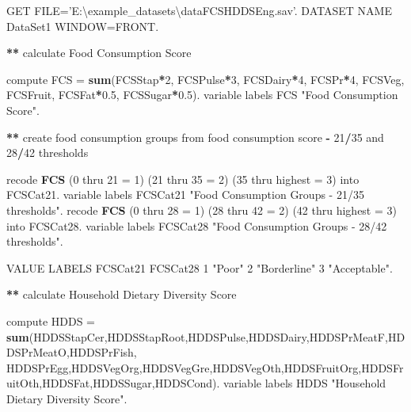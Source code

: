 \documentclass[
]{book}
\newenvironment{Shaded}{\begin{snugshade}}{\end{snugshade}}
\newcommand{\CharTok}[1]{\textcolor[rgb]{0.31,0.60,0.02}{#1}}
\newcommand{\DataTypeTok}[1]{\textcolor[rgb]{0.13,0.29,0.53}{#1}}
\newcommand{\DecValTok}[1]{\textcolor[rgb]{0.00,0.00,0.81}{#1}}
\newcommand{\FloatTok}[1]{\textcolor[rgb]{0.00,0.00,0.81}{#1}}
\newcommand{\KeywordTok}[1]{\textcolor[rgb]{0.13,0.29,0.53}{\textbf{#1}}}
\newcommand{\NormalTok}[1]{#1}
\newcommand{\OperatorTok}[1]{\textcolor[rgb]{0.81,0.36,0.00}{\textbf{#1}}}
\newcommand{\StringTok}[1]{\textcolor[rgb]{0.31,0.60,0.02}{#1}}
\begin{document}
\begin{Shaded}
\begin{Highlighting}[]
\NormalTok{GET}
\NormalTok{  FILE=}\StringTok{'E:}\CharTok{\textbackslash{}e}\StringTok{xample_datasets\textbackslash{}dataFCSHDDSEng.sav'}\NormalTok{.}
\NormalTok{DATASET NAME DataSet1 WINDOW=FRONT.}

\OperatorTok{**}\StringTok{ }\NormalTok{calculate Food Consumption Score }

\NormalTok{compute FCS =}\StringTok{ }\KeywordTok{sum}\NormalTok{(FCSStap}\OperatorTok{*}\DecValTok{2}\NormalTok{, FCSPulse}\OperatorTok{*}\DecValTok{3}\NormalTok{, FCSDairy}\OperatorTok{*}\DecValTok{4}\NormalTok{, FCSPr}\OperatorTok{*}\DecValTok{4}\NormalTok{, FCSVeg, FCSFruit, FCSFat}\OperatorTok{*}\FloatTok{0.5}\NormalTok{, FCSSugar}\OperatorTok{*}\FloatTok{0.5}\NormalTok{).}
\NormalTok{variable labels FCS }\StringTok{"Food Consumption Score"}\NormalTok{.}

\OperatorTok{**}\StringTok{ }\NormalTok{create food consumption groups from food consumption score }\OperatorTok{-}\StringTok{ }\DecValTok{21}\OperatorTok{/}\DecValTok{35}\NormalTok{ and }\DecValTok{28}\OperatorTok{/}\DecValTok{42}\NormalTok{ thresholds}

\NormalTok{recode }\KeywordTok{FCS}\NormalTok{ (}\DecValTok{0}\NormalTok{ thru }\DecValTok{21}\NormalTok{ =}\StringTok{ }\DecValTok{1}\NormalTok{) (}\DecValTok{21}\NormalTok{ thru }\DecValTok{35}\NormalTok{ =}\StringTok{ }\DecValTok{2}\NormalTok{) (}\DecValTok{35}\NormalTok{ thru }\DataTypeTok{highest =} \DecValTok{3}\NormalTok{) into FCSCat21.}
\NormalTok{variable labels FCSCat21 }\StringTok{"Food Consumption Groups - 21/35 thresholds"}\NormalTok{.}
\NormalTok{recode }\KeywordTok{FCS}\NormalTok{ (}\DecValTok{0}\NormalTok{ thru }\DecValTok{28}\NormalTok{ =}\StringTok{ }\DecValTok{1}\NormalTok{) (}\DecValTok{28}\NormalTok{ thru }\DecValTok{42}\NormalTok{ =}\StringTok{ }\DecValTok{2}\NormalTok{) (}\DecValTok{42}\NormalTok{ thru }\DataTypeTok{highest =} \DecValTok{3}\NormalTok{) into FCSCat28.}
\NormalTok{variable labels FCSCat28  }\StringTok{"Food Consumption Groups - 28/42 thresholds"}\NormalTok{.}

\NormalTok{VALUE LABELS FCSCat21 FCSCat28 }
\DecValTok{1} \StringTok{"Poor"}
\DecValTok{2} \StringTok{"Borderline"}
\DecValTok{3} \StringTok{"Acceptable"}\NormalTok{.}

\OperatorTok{**}\StringTok{ }\NormalTok{calculate Household Dietary Diversity Score}

\NormalTok{compute HDDS =}\StringTok{ }\KeywordTok{sum}\NormalTok{(HDDSStapCer,HDDSStapRoot,HDDSPulse,HDDSDairy,HDDSPrMeatF,HDDSPrMeatO,HDDSPrFish,}
\NormalTok{HDDSPrEgg,HDDSVegOrg,HDDSVegGre,HDDSVegOth,HDDSFruitOrg,HDDSFruitOth,HDDSFat,HDDSSugar,HDDSCond).}
\NormalTok{variable labels HDDS }\StringTok{"Household Dietary Diversity Score"}\NormalTok{.}
\end{Highlighting}
\end{Shaded}
\end{document}
